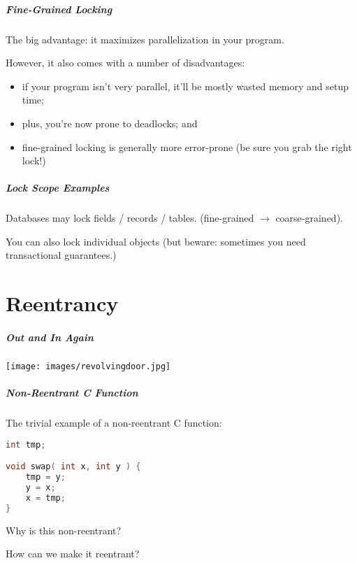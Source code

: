 \begin{frame}
\frametitle{Fine-Grained Locking} 

The big advantage: it maximizes parallelization in your program.

However, it also comes with a number of disadvantages:
  \begin{itemize}
    \item if your program isn't very parallel, it'll be mostly wasted memory and setup time;
    \item plus, you're now prone to deadlocks; and
    \item fine-grained locking is generally more error-prone (be sure you grab the right lock!)
  \end{itemize}

\end{frame}

\begin{frame}
\frametitle{Lock Scope Examples}


    Databases may lock fields / records / tables. (fine-grained $\rightarrow$ coarse-grained).

    You can also lock individual objects (but beware: sometimes you need transactional guarantees.)



\end{frame}

\part{Reentrancy}
\frame{\partpage}


\begin{frame}
\frametitle{Out and In Again}

\begin{center}
	\texttt{[image: images/revolvingdoor.jpg]}
\end{center}

\end{frame}


\begin{frame}[fragile]
\frametitle{Non-Reentrant C Function}

The trivial example of a non-reentrant C function:

\begin{lstlisting}[language=C]
int tmp;

void swap( int x, int y ) {
    tmp = y;
    y = x;
    x = tmp;
}
\end{lstlisting}

Why is this non-reentrant?

How can we make it reentrant?

\end{frame}

